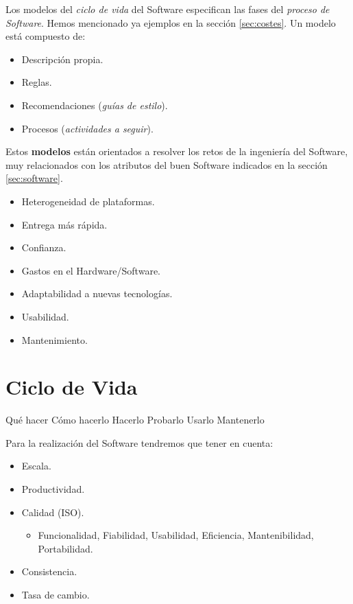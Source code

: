 Los modelos del \emph{ciclo de vida} del Software especifican las
fases del \emph{proceso de Software}. Hemos mencionado ya ejemplos en
la sección \ref{sec:costes}. Un modelo está compuesto de:
\begin{itemize}[noitemsep]
\item Descripción propia.
\item Reglas.
\item Recomendaciones (\emph{guías de estilo}).
\item Procesos (\emph{actividades a seguir}).
\end{itemize}

Estos \textbf{modelos} están orientados a resolver los retos de la ingeniería
del Software, muy relacionados con los atributos
del buen Software indicados en la sección \ref{sec:software}.

\begin{itemize}[noitemsep]
\item Heterogeneidad de plataformas.
\item Entrega más rápida.
\item Confianza.
\item Gastos en el Hardware/Software.
\item Adaptabilidad a nuevas tecnologías.
\item Usabilidad.
\item Mantenimiento.
\end{itemize}

\section{Ciclo de Vida}
\label{sec:cv}

\begin{center}
Qué hacer \textrightarrow Cómo hacerlo \textrightarrow Hacerlo
\textrightarrow Probarlo \textrightarrow Usarlo \textrightarrow
Mantenerlo
\end{center}

Para la realización del Software tendremos que tener en cuenta:
\begin{itemize}[noitemsep]
\item Escala.
\item Productividad.
\item Calidad (ISO).
  \begin{itemize}
  \item Funcionalidad, Fiabilidad, Usabilidad, Eficiencia,
    Mantenibilidad, Portabilidad.
  \end{itemize}
\item Consistencia.
\item Tasa de cambio.
\end{itemize}

